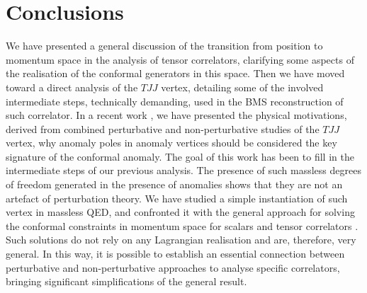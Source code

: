 \documentclass[a4paper,11pt,openright,twoside]{book}
\numberwithin{equation}{section}
\begin{document}
{{\section{Conclusions}
We have  presented a general discussion of the transition from position to momentum space in the analysis of tensor correlators, clarifying some aspects of 
the realisation of the conformal generators in this space. 
Then we have moved toward a direct analysis of the $TJJ$ vertex, detailing some of the involved intermediate steps, technically demanding, used in the BMS reconstruction of such correlator.  
In a recent work \cite{Coriano:2018zdo}, we have presented the physical motivations, derived from combined perturbative and non-perturbative studies of the $TJJ$ vertex, why anomaly poles in anomaly vertices should be considered the key signature of the conformal anomaly. The goal of this work has been to fill in the intermediate steps of our previous analysis. The presence of such massless degrees of freedom generated in the presence of anomalies shows that they are not an artefact of perturbation theory.  
We have studied a simple instantiation of 
such vertex in massless QED, and confronted it with the 
general approach for solving the conformal constraints in momentum space for scalars \cite{Armillis:2009pq,Bzowski:2013sza} and tensor correlators \cite{Bzowski:2013sza,Bzowski:2017poo}. 
Such solutions do not rely on any Lagrangian realisation and are, therefore, very general. In this way, it is possible to establish an essential connection between perturbative and non-perturbative approaches to analyse specific correlators, bringing significant simplifications of the general result.

}}
\end{document}
